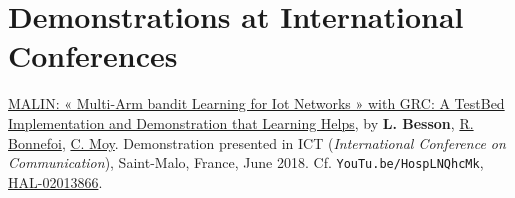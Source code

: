 \section*{Demonstrations at International Conferences}
\renewcommand{\labelenumi}{[DEMO-\arabic{enumi}]}
\begin{etaremune}
\item
  \href{https://perso.crans.org/besson/articles/BBM__Demo_ICT_2018.pdf}{MALIN:
  « Multi-Arm bandit Learning for Iot Networks » with GRC: A TestBed
  Implementation and Demonstration that Learning Helps}, by \textbf{L.
  Besson}, \href{https://remibonnefoi.wordpress.com/}{R. Bonnefoi},
  \href{https://moychris.wordpress.com/}{C. Moy}. Demonstration
  presented in ICT (\emph{International Conference on Communication}),
  Saint-Malo, France, June 2018. Cf. \texttt{YouTu.be/HospLNQhcMk}, \href{https://hal.inria.fr/hal-02013866}{HAL-02013866}.
  \cite{Besson2018ICT}
\end{etaremune}


